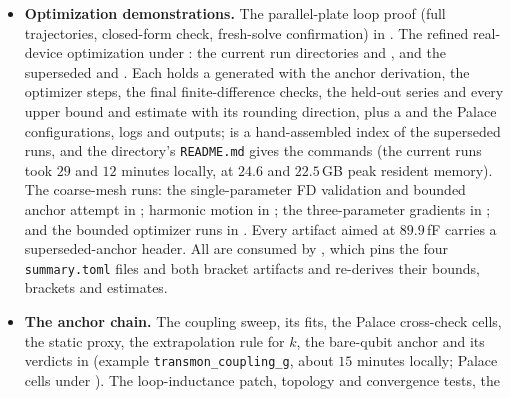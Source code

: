 \documentclass{anvil-paper}
\begin{document}
\begin{itemize}
     (PRs \#575/\#586; this module
    also carries \texttt{capacitance\_shape\_gradient});
     (PR \#579); and
     (PR \#581).
  \item \textbf{Optimization demonstrations.} The parallel-plate loop
    proof (full trajectories, closed-form check, fresh-solve
    confirmation) in .
    The refined real-device optimization under
    : the current
    run directories  and
    , and the
    superseded  and
    . Each holds a generated
     with the anchor derivation, the optimizer
    steps, the final finite-difference checks, the held-out series and
    every upper bound and estimate with its rounding direction, plus a
     and the Palace configurations, logs and outputs;
     is a hand-assembled index of the
    superseded runs, and the directory's \texttt{README.md} gives the
    commands (the current runs took $29$ and $12$ minutes locally, at
    $24.6$ and $22.5$\,GB peak resident memory).
    The coarse-mesh runs: the single-parameter FD validation and
    bounded anchor attempt in
    ; harmonic motion
    in ; the
    three-parameter gradients in
    ; and the
    bounded optimizer runs in
    . Every
    artifact aimed at $89.9$\,fF carries a superseded-anchor header. All
    are consumed by ,
    which pins the four \texttt{summary.toml} files and both bracket
    artifacts and re-derives their bounds, brackets and estimates.
  \item \textbf{The anchor chain.} The coupling sweep, its fits, the
    Palace cross-check cells, the static proxy, the extrapolation rule
    for $k$, the bare-qubit anchor and its verdicts in
     (example
    \texttt{transmon\_coupling\_g}, about $15$ minutes locally; Palace
    cells under
    ).
    The loop-inductance patch, topology and convergence tests, the

\end{itemize}
\end{document}
